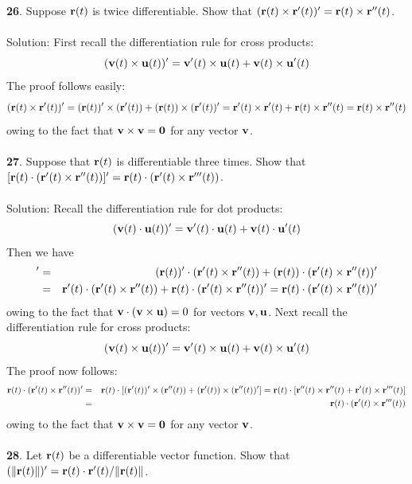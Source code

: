 \documentclass[12pt]{amsbook}
\begin{document}
{\small\bf 26}. Suppose ${\bf r}(t)$ is twice differentiable. Show that $({\bf r}(t)\times{\bf r}'(t))'={\bf r}(t)\times {\bf r}''(t)$.
\\
\\
{\sc Solution}: First recall the differentiation rule for cross products:
$$({\bf v}(t)\times{\bf u}(t))'={\bf v}'(t)\times{\bf u}(t)+{\bf v}(t)\times{\bf u}'(t)$$
The proof follows easily:
$$({\bf r}(t)\times{\bf r}'(t))'=({\bf r}(t))'\times({\bf r}'(t))+({\bf r}(t))\times({\bf r}'(t))'={\bf r}'(t)\times{\bf r}'(t)+{\bf r}(t)\times{\bf r}''(t)={\bf r}(t)\times {\bf r}''(t)$$
owing to the fact that ${\bf v}\times{\bf v}={\bf 0}$ for any vector $\bf v$.
\\
\\
{\small\bf 27}. Suppose that ${\bf r}(t)$ is differentiable three times. Show that $[{\bf r}(t)\cdot({\bf r}'(t)\times{\bf r}''(t))]'={\bf r}(t)\cdot({\bf r}'(t)\times{\bf r}'''(t))$. 
\\
\\
{\sc Solution}: Recall the differentiation rule for dot products:
$$({\bf v}(t)\cdot{\bf u}(t))'={\bf v}'(t)\cdot{\bf u}(t)+{\bf v}(t)\cdot{\bf u}'(t)$$
Then we have
\begin{eqnarray*}
[{\bf r}(t)\cdot({\bf r}'(t)\times{\bf r}''(t))]'&=&
({\bf r}(t))'\cdot({\bf r}'(t)\times{\bf r}''(t))+({\bf r}(t))\cdot({\bf r}'(t)\times{\bf r}''(t))'
\\
&=&{\bf r}'(t)\cdot({\bf r}'(t)\times{\bf r}''(t))+{\bf r}(t)\cdot({\bf r}'(t)\times{\bf r}''(t))'={\bf r}(t)\cdot({\bf r}'(t)\times{\bf r}''(t))'
\end{eqnarray*}
owing to the fact that ${\bf v}\cdot ({\bf v}\times{\bf u})=0$ for vectors ${\bf v}, {\bf u}$. 
Next recall the differentiation rule for cross products:
$$({\bf v}(t)\times{\bf u}(t))'={\bf v}'(t)\times{\bf u}(t)+{\bf v}(t)\times{\bf u}'(t)$$
The proof now follows:
\begin{eqnarray*}
{\bf r}(t)\cdot({\bf r}'(t)\times{\bf r}''(t))'&=&{\bf r}(t)\cdot[({\bf r}'(t))'\times({\bf r}''(t))+({\bf r}'(t))\times({\bf r}''(t))']={\bf r}(t)\cdot[{\bf r}''(t)\times{\bf r}''(t)+{\bf r}'(t)\times{\bf r}'''(t)]\\
&=&{\bf r}(t)\cdot({\bf r}'(t)\times{\bf r}'''(t))
\end{eqnarray*}
owing to the fact that ${\bf v}\times{\bf v}={\bf 0}$ for any vector $\bf v$.
\\
\\
{\small\bf 28}. Let ${\bf r}(t)$ be a differentiable vector function. Show that $(\|{\bf r}(t)\|)'={\bf r}(t)\cdot{\bf r}'(t)/\|{\bf r}(t)\|$.
\end{document}
